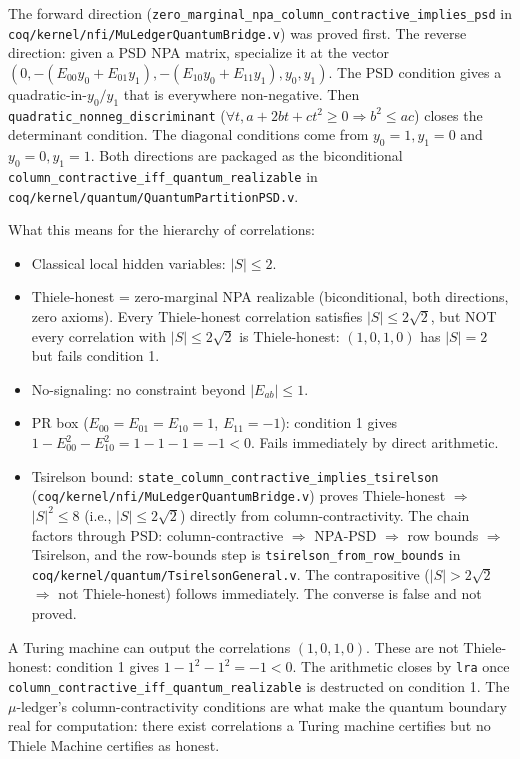 \documentclass[11pt,a4paper]{article}
\theoremstyle{plain}
\theoremstyle{definition}
\theoremstyle{remark}
\begin{document}
The forward direction (\texttt{zero\_marginal\_npa\_column\_contractive\_implies\_psd} in \texttt{coq/kernel/nfi/MuLedgerQuantumBridge.v}) was proved first. The reverse direction: given a PSD NPA matrix, specialize it at the vector $(0, -(E_{00}y_0 + E_{01}y_1), -(E_{10}y_0 + E_{11}y_1), y_0, y_1)$. The PSD condition gives a quadratic-in-$y_0/y_1$ that is everywhere non-negative. Then \texttt{quadratic\_nonneg\_discriminant} ($\forall t, a + 2bt + ct^2 \geq 0 \Rightarrow b^2 \leq ac$) closes the determinant condition. The diagonal conditions come from $y_0 = 1, y_1 = 0$ and $y_0 = 0, y_1 = 1$. Both directions are packaged as the biconditional \texttt{column\_contractive\_iff\_quantum\_realizable} in \texttt{coq/kernel/quantum/QuantumPartitionPSD.v}.

What this means for the hierarchy of correlations:
\begin{itemize}
\item Classical local hidden variables: $|S| \leq 2$.
\item Thiele-honest = zero-marginal NPA realizable (biconditional, both directions, zero axioms). Every Thiele-honest correlation satisfies $|S| \leq 2\sqrt{2}$, but NOT every correlation with $|S| \leq 2\sqrt{2}$ is Thiele-honest: $(1,0,1,0)$ has $|S|=2$ but fails condition 1.
\item No-signaling: no constraint beyond $|E_{ab}| \leq 1$.
\item PR box ($E_{00} = E_{01} = E_{10} = 1$, $E_{11} = -1$): condition 1 gives $1 - E_{00}^2 - E_{10}^2 = 1 - 1 - 1 = -1 < 0$. Fails immediately by direct arithmetic.
\item Tsirelson bound: \texttt{state\_column\_contractive\_implies\_tsirelson} (\texttt{coq/kernel/nfi/MuLedgerQuantumBridge.v}) proves Thiele-honest $\Rightarrow$ $|S|^2 \leq 8$ (i.e., $|S| \leq 2\sqrt{2}$) directly from column-contractivity. The chain factors through PSD: column-contractive $\Rightarrow$ NPA-PSD $\Rightarrow$ row bounds $\Rightarrow$ Tsirelson, and the row-bounds step is \texttt{tsirelson\_from\_row\_bounds} in \texttt{coq/kernel/quantum/TsirelsonGeneral.v}. The contrapositive ($|S| > 2\sqrt{2}$ $\Rightarrow$ not Thiele-honest) follows immediately. The converse is false and not proved.
\end{itemize}

A Turing machine can output the correlations $(1, 0, 1, 0)$. These are not Thiele-honest: condition 1 gives $1 - 1^2 - 1^2 = -1 < 0$. The arithmetic closes by \texttt{lra} once \texttt{column\_contractive\_iff\_quantum\_realizable} is destructed on condition 1. The $\mu$-ledger's column-contractivity conditions are what make the quantum boundary real for computation: there exist correlations a Turing machine certifies but no Thiele Machine certifies as honest.
\end{document}
